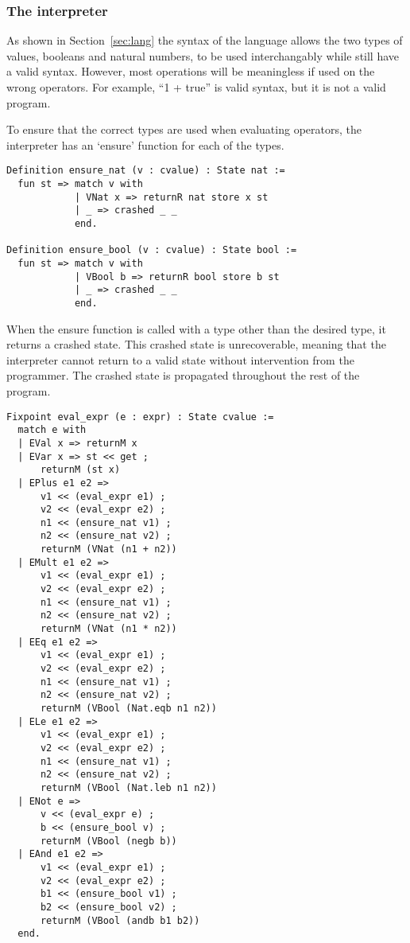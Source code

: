 \subsubsection{The interpreter}
As shown in Section~\ref{sec:lang} the syntax of the language allows the two
types of values, booleans and natural numbers, to be used interchangably while
still have a valid syntax. However, most operations will be meaningless if used
on the wrong operators. For example, ``1 + true'' is valid syntax, but it is 
not a valid program.

To ensure that the correct types are used when evaluating operators,
the interpreter has an `ensure' function for each of the types. 

\begin{verbatim}
Definition ensure_nat (v : cvalue) : State nat :=
  fun st => match v with
            | VNat x => returnR nat store x st
            | _ => crashed _ _
            end.
            
Definition ensure_bool (v : cvalue) : State bool :=
  fun st => match v with
            | VBool b => returnR bool store b st
            | _ => crashed _ _
            end.
\end{verbatim}

When the ensure function is called with a type other than the desired type, it
returns a crashed state. This crashed state is unrecoverable, meaning that the
interpreter cannot return to a valid state without intervention from the
programmer. The crashed state is propagated throughout the rest of the program.

\begin{verbatim}
Fixpoint eval_expr (e : expr) : State cvalue :=
  match e with
  | EVal x => returnM x
  | EVar x => st << get ;
      returnM (st x)
  | EPlus e1 e2 => 
      v1 << (eval_expr e1) ;
      v2 << (eval_expr e2) ;
      n1 << (ensure_nat v1) ;
      n2 << (ensure_nat v2) ;
      returnM (VNat (n1 + n2))
  | EMult e1 e2 =>
      v1 << (eval_expr e1) ;
      v2 << (eval_expr e2) ;
      n1 << (ensure_nat v1) ;
      n2 << (ensure_nat v2) ;
      returnM (VNat (n1 * n2))
  | EEq e1 e2 =>
      v1 << (eval_expr e1) ;
      v2 << (eval_expr e2) ;
      n1 << (ensure_nat v1) ;
      n2 << (ensure_nat v2) ;
      returnM (VBool (Nat.eqb n1 n2))
  | ELe e1 e2 =>
      v1 << (eval_expr e1) ;
      v2 << (eval_expr e2) ;
      n1 << (ensure_nat v1) ;
      n2 << (ensure_nat v2) ;
      returnM (VBool (Nat.leb n1 n2))
  | ENot e =>
      v << (eval_expr e) ;
      b << (ensure_bool v) ;
      returnM (VBool (negb b))
  | EAnd e1 e2 =>
      v1 << (eval_expr e1) ;
      v2 << (eval_expr e2) ;
      b1 << (ensure_bool v1) ;
      b2 << (ensure_bool v2) ;
      returnM (VBool (andb b1 b2))
  end.
\end{verbatim}

